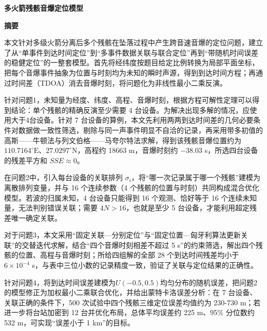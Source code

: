\documentclass[12pt,a4paper]{article}
\begin{document}
\setcounter{page}{1}

\begin{center}
{\bfseries 多火箭残骸音爆定位模型}

\vspace{2ex}
{\bfseries 摘要}
\end{center}

本文针对多级火箭分离后多个残骸在坠落过程中产生跨音速音爆的定位问题，建立了从“单事件到达时间定位”到“多事件数据关联与联合定位”再到“带随机时间误差的稳健定位”的一整套模型。首先将经纬度按题目给定比例转换为局部平面坐标，把每个音爆事件抽象为位置与时刻均为未知的瞬时声源，得到到达时间方程；再通过时间差（TDOA）消去音爆时刻，将问题化为非线性最小二乘反演。

针对问题1，未知量为经度、纬度、高程、音爆时刻，根据方程可解性定理可以得到结论：单个残骸的精确反演至少需要 4 台设备。为解决出现多解的情况，应使用大于4台设备。针对 7 台设备的算例，本文先利用两两到达时间差的几何必要条件对数据做一致性筛选，剔除与同一声事件明显不自洽的记录，再采用带多初值的高斯——牛顿法与列文伯格——马夸尔特法求解，得到该残骸音爆位置约为 $110.7164^\circ\mathrm{E}$、$27.0297^\circ\mathrm{N}$，高程约 18663 m，音爆时刻约 $-38.03$ s，所选四台设备的残差平方和 $SSE\approx 0$。

在问题2中，引入每台设备的关联排列 $\sigma_i$，将“哪一次记录属于哪一个残骸”建模为离散排列变量，并与 16 个连续参数（4 个残骸的位置与时刻）共同构成混合优化模型。若波的归属未知，4 台设备只能得到 16 个观测、恰好等于 16 个连续未知量，无法判别错误关联；需要 $4N>16$，也就是至少 5 台设备，才能利用超定残差唯一确定关联。

对于问题3，本文采用“固定关联—分别定位”与“固定位置—匈牙利算法更新关联”的交替迭代求解，结合“四个音爆时刻相差不超过 5 s”的约束筛选，解出四个残骸的位置、高程与音爆时刻；所给四组解的全部 28 个到达时间残差均小于 $6\times10^{-4}$ s，与表中三位小数的记录精度一致，验证了关联与定位结果的正确性。

针对问题4，将到达时间误差建模为$U(-0.5,0.5)$均匀分布的随机误差，把问题2的模型修正为加权最小二乘联合优化，并给出蒙特卡洛误差分析：在 7 台设备、关联正确的条件下，500 次试验中四个残骸三维定位误差均值约为 230-730 m；若进一步将台站加密到 12 台并优化布局，总体平均误差约 225 m、95\% 分位数约 532 m，可实现“误差小于 1 km”的目标。
\end{document}
